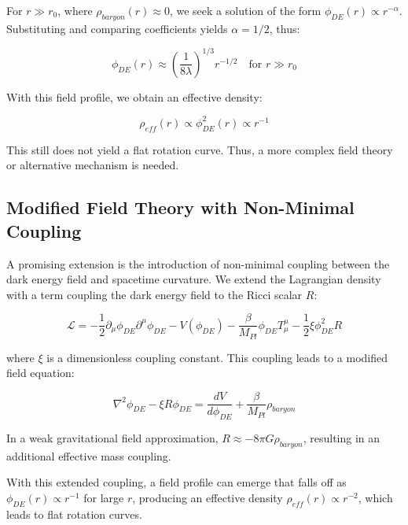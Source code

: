 \documentclass[a4paper,12pt]{article}
\begin{document}
	For $r \gg r_0$, where $\rho_{baryon}(r) \approx 0$, we seek a solution of the form $\phi_{DE}(r) \propto r^{-\alpha}$. Substituting and comparing coefficients yields $\alpha = 1/2$, thus:
	
	\begin{equation}
		\phi_{DE}(r) \approx \left(\frac{1}{8\lambda}\right)^{1/3} r^{-1/2} \quad \text{for } r \gg r_0
	\end{equation}
	
	With this field profile, we obtain an effective density:
	
	\begin{equation}
		\rho_{eff}(r) \propto \phi_{DE}^2(r) \propto r^{-1}
	\end{equation}
	
	This still does not yield a flat rotation curve. Thus, a more complex field theory or alternative mechanism is needed.
	
	\subsection{Modified Field Theory with Non-Minimal Coupling}
	
	A promising extension is the introduction of non-minimal coupling between the dark energy field and spacetime curvature. We extend the Lagrangian density with a term coupling the dark energy field to the Ricci scalar $R$:
	
	\begin{equation}
		\mathcal{L} = -\frac{1}{2}\partial_\mu \phi_{DE} \partial^\mu \phi_{DE} - V(\phi_{DE}) - \frac{\beta}{M_{Pl}}\phi_{DE}T^{\mu}_{\mu} - \frac{1}{2}\xi \phi_{DE}^2 R
	\end{equation}
	
	where $\xi$ is a dimensionless coupling constant. This coupling leads to a modified field equation:
	
	\begin{equation}
		\nabla^2 \phi_{DE} - \xi R \phi_{DE} = \frac{dV}{d\phi_{DE}} + \frac{\beta}{M_{Pl}}\rho_{baryon}
	\end{equation}
	
	In a weak gravitational field approximation, $R \approx -8\pi G \rho_{baryon}$, resulting in an additional effective mass coupling.
	
	With this extended coupling, a field profile can emerge that falls off as $\phi_{DE}(r) \propto r^{-1}$ for large $r$, producing an effective density $\rho_{eff}(r) \propto r^{-2}$, which leads to flat rotation curves.
	
\end{document}
